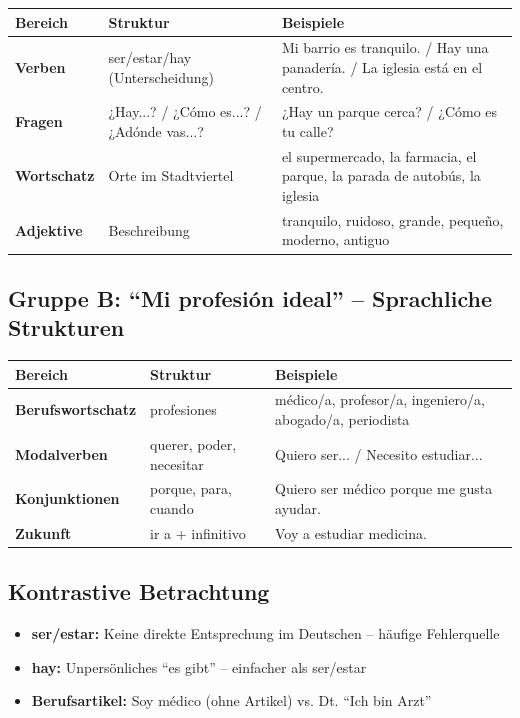 \documentclass[11pt,a4paper]{article}
\begin{document}
\begin{tabular}{|l|p{6cm}|p{5cm}|}
\hline
\textbf{Bereich} & \textbf{Struktur} & \textbf{Beispiele} \\
\hline
\textbf{Verben} & ser/estar/hay (Unterscheidung) & Mi barrio es tranquilo. / Hay una panadería. / La iglesia está en el centro. \\
\hline
\textbf{Fragen} & ¿Hay...? / ¿Cómo es...? / ¿Adónde vas...? & ¿Hay un parque cerca? / ¿Cómo es tu calle? \\
\hline
\textbf{Wortschatz} & Orte im Stadtviertel & el supermercado, la farmacia, el parque, la parada de autobús, la iglesia \\
\hline
\textbf{Adjektive} & Beschreibung & tranquilo, ruidoso, grande, pequeño, moderno, antiguo \\
\hline
\end{tabular}

\subsection{Gruppe B: ``Mi profesión ideal'' -- Sprachliche Strukturen}

\begin{tabular}{|l|p{6cm}|p{5cm}|}
\hline
\textbf{Bereich} & \textbf{Struktur} & \textbf{Beispiele} \\
\hline
\textbf{Berufswortschatz} & profesiones & médico/a, profesor/a, ingeniero/a, abogado/a, periodista \\
\hline
\textbf{Modalverben} & querer, poder, necesitar & Quiero ser... / Necesito estudiar... \\
\hline
\textbf{Konjunktionen} & porque, para, cuando & Quiero ser médico porque me gusta ayudar. \\
\hline
\textbf{Zukunft} & ir a + infinitivo & Voy a estudiar medicina. \\
\hline
\end{tabular}

\subsection{Kontrastive Betrachtung}
\begin{itemize}
    \item \textbf{ser/estar:} Keine direkte Entsprechung im Deutschen -- häufige Fehlerquelle
    \item \textbf{hay:} Unpersönliches ``es gibt'' -- einfacher als ser/estar
    \item \textbf{Berufsartikel:} Soy médico (ohne Artikel) vs. Dt. ``Ich bin Arzt''
\end{itemize}
\end{document}
